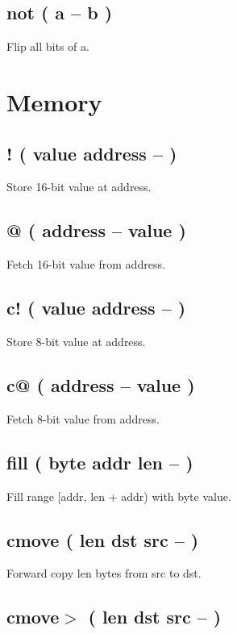 \subsection{not ( a -- b )}

Flip all bits of a.


\section{Memory}

\subsection{! ( value address -- )}

Store 16-bit value at address.

\subsection{@ ( address -- value )}

Fetch 16-bit value from address.

\subsection{c! ( value address -- )}

Store 8-bit value at address.

\subsection{c@ ( address -- value )}

Fetch 8-bit value from address.

\subsection{fill ( byte addr len -- )}

Fill range [addr, len + addr) with byte value.

\subsection{cmove ( len dst src -- )}

Forward copy len bytes from src to dst.

\subsection{cmove$>$ ( len dst src -- )}


